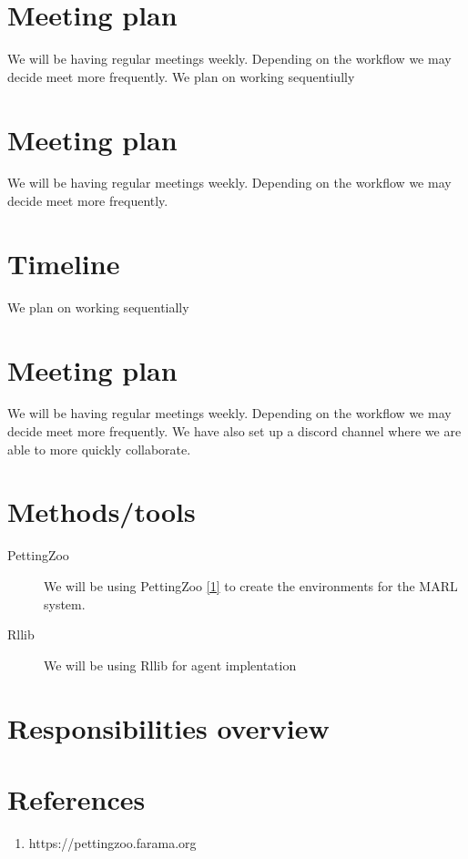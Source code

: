 \documentclass{article}
\begin{document}
\section{Meeting plan}
We will be having regular meetings weekly. Depending on the workflow we may decide meet more frequently.
We plan on working sequentiully
\section{Meeting plan}
We will be having regular meetings weekly. Depending on the workflow we may decide meet more frequently.
\section{Timeline}
We plan on working sequentially

\section{Meeting plan}
We will be having regular meetings weekly. Depending on the workflow we may decide meet more frequently.
We have also set up a discord channel where we are able to more quickly collaborate.
\section{Methods/tools}
\begin{description}
  \item[PettingZoo] We will be using PettingZoo \href{https://pettingzoo.farama.org}{[1]} to create the environments for the MARL system.
  \item[Rllib] We will be using Rllib for agent implentation
\end{description}


\section{Responsibilities overview}


\section*{References}
\begin{enumerate}
  \item https://pettingzoo.farama.org
\end{enumerate}
\end{document}
